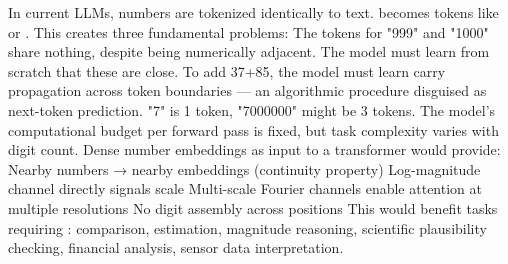 {}\markdownRendererThematicBreak{}\markdownRendererInterblockSeparator
{}
\markdownRendererSectionEnd 
\markdownRendererSectionEnd \markdownRendererSectionBegin
{}\markdownRendererInterblockSeparator
{}\markdownRendererSectionBegin
{}\markdownRendererInterblockSeparator
{}In current LLMs, numbers are tokenized identically to text.  becomes tokens like \markdownRendererCodeSpan{["12", "34"]} or \markdownRendererCodeSpan{["1", "234"]}. This creates three fundamental problems:\markdownRendererInterblockSeparator
{}\markdownRendererOlBeginTight
{} The tokens for "999" and "1000" share nothing, despite being numerically adjacent. The model must learn from scratch that these are close.\markdownRendererOlItemEnd 
{} To add 37+85, the model must learn carry propagation across token boundaries — an algorithmic procedure disguised as next-token prediction.\markdownRendererOlItemEnd 
{} "7" is 1 token, "7000000" might be 3 tokens. The model's computational budget per forward pass is fixed, but task complexity varies with digit count.\markdownRendererOlItemEnd 
\markdownRendererOlEndTight \markdownRendererInterblockSeparator
{}
\markdownRendererSectionEnd \markdownRendererSectionBegin
{}\markdownRendererInterblockSeparator
{}Dense number embeddings as input to a transformer would provide:\markdownRendererInterblockSeparator
{}\markdownRendererUlBeginTight
\markdownRendererUlItem {} Nearby numbers → nearby embeddings (continuity property)\markdownRendererUlItemEnd 
\markdownRendererUlItem {} Log-magnitude channel directly signals scale\markdownRendererUlItemEnd 
\markdownRendererUlItem {} Multi-scale Fourier channels enable attention at multiple resolutions\markdownRendererUlItemEnd 
\markdownRendererUlItem {} No digit assembly across positions\markdownRendererUlItemEnd 
\markdownRendererUlEndTight \markdownRendererInterblockSeparator
{}This would benefit tasks requiring : comparison, estimation, magnitude reasoning, scientific plausibility checking, financial analysis, sensor data interpretation.\markdownRendererInterblockSeparator
